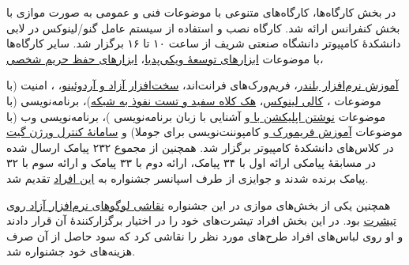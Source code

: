 \documentclass{article}
\begin{document}
در بخش کارگاه‌ها، کارگاه‌های متنوعی با موضوعات فنی و عمومی به صورت موازی با بخش کنفرانس ارائه شد. کارگاه نصب و استفاده از سیستم عامل گنو/لینوکس در لابی دانشکدهٔ کامپیوتر دانشگاه صنعتی شریف از ساعت ۱۰ تا ۱۶ برگزار شد. سایر کارگاه‌ها با موضوعات
\hspace{25pt}\href{https://www.youtube.com/watch?v=U_r1nsnIu5c&index=12&list=PLzkZTZKm4j8GhgZ_O4k7uzJFcA0Ai5FIL}{ابزارهای توسعهٔ ویکی‌پدیا}، \href{https://www.youtube.com/watch?v=ORnXkMFw2v4&list=PLzkZTZKm4j8GhgZ_O4k7uzJFcA0Ai5FIL&index=13}{ابزارهای حفظ حریم شخصی}، {\href{https://www.youtube.com/watch?v=BZaZr5K5f64&list=PLzkZTZKm4j8GhgZ_O4k7uzJFcA0Ai5FIL&index=14}{آموزش نرم‌افزار بلندر}، فریم‌ورک‌های فرانت‌اند، {\href{https://www.youtube.com/watch?v=Qp6fcUIAe-A&list=PLzkZTZKm4j8GhgZ_O4k7uzJFcA0Ai5FIL&index=15}{سخت‌افزار آزاد و آردوئینو}، ، امنیت (با موضوعات ، \href{https://www.youtube.com/watch?v=22ijjCLk2dw&list=PLzkZTZKm4j8GhgZ_O4k7uzJFcA0Ai5FIL&index=18}{کالی لینوکس}، \href{https://www.youtube.com/watch?v=XFumj-_CTGQ&list=PLzkZTZKm4j8GhgZ_O4k7uzJFcA0Ai5FIL&index=19}{هک کلاه سفید و تست نفوذ به شبکه})، برنامه‌نویسی (با موضوعات \href{http://sfd.fsug.ir/1394/workshops/73-qt}{نوشتن اپلیکشن با } و آشنایی با زبان برنامه‌نویسی )، برنامه‌نویسی وب (با موضوعات \href{http://sfd.fsug.ir/1394/workshops/72-yii2}{آموزش فریمورک }} و کامپوننت‌نویسی برای جوملا) و \href{https://www.youtube.com/watch?v=BvU-Z7oXvmg&list=PLzkZTZKm4j8GhgZ_O4k7uzJFcA0Ai5FIL&index=20}{سامانهٔ کنترل ورژن گیت} در کلاس‌های دانشکدهٔ کامپیوتر برگزار شد. همچنین از مجموع ۲۳۲ پیامک ارسال شده در مسابقهٔ پیامکی ارائه اول با ۳۴ پیامک، ارائه دوم با ۳۳ پیامک و ارائه سوم با ۳۲ پیامک برنده شدند و جوایزی از طرف اسپانسر جشنواره به  \href{https://twitter.com/tehsfd/status/725078247520788482}{این افراد} تقدیم شد.

همچنین یکی از بخش‌های موازی در این جشنواره \href{http://sfd.fsug.ir/1394/paint}{نقاشی لوگوهای نرم‌افزار آزاد روی تیشرت} بود. در این بخش افراد تیشرت‌های خود را در اختیار برگزارکنندهٔ آن قرار دادند و او روی لباس‌های افراد طرح‌های مورد نظر را نقاشی کرد که سود حاصل از آن صرف هزینه‌های خود جشنواره شد.

}
\end{document}
